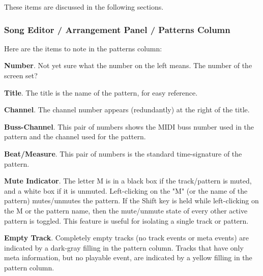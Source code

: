    These items are discussed in the following sections.

\subsubsection{Song Editor / Arrangement Panel / Patterns Column}
\label{subsubsec:seq64_song_editor_arrangement_panel_patterns_column}

   Here are the items to note in the patterns column:

   \begin{enumber}
      \item \textbf{Number}.
         Not yet sure what the number on the left means.
         The number of the screen set?
      \item \textbf{Title}.
         The title is the name of the pattern, for easy reference.
      \item \textbf{Channel}.
         The channel number appears (redundantly)
         at the right of the title.
      \item \textbf{Buss-Channel}.
         This pair of numbers shows the MIDI buss number used in the pattern
         and the channel used for the pattern.
      \item \textbf{Beat/Measure}.
         This pair of numbers is the standard time-signature of the pattern.
      \item \textbf{Mute Indicator}.
         The letter M is in a black box if the track/pattern is muted, and a
         white box if it is unmuted.
         Left-clicking on the "M" (or the name of the pattern)
         mutes/unmutes the pattern.
         If the Shift key is held while left-clicking on the M or the pattern
         name, then
         the mute/unmute state of every other active pattern is toggled.
         This feature is useful for isolating a single track or pattern.
      \item \textbf{Empty Track}.
         Completely empty tracks (no track events or meta events)
         are indicated by a dark-gray filling in the pattern column.
         Tracks that have only meta information, but no playable event, are
         indicated by a yellow filling in the pattern column.
   \end{enumber}

